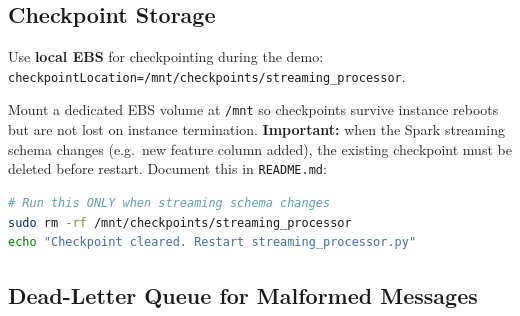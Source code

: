 \documentclass[11pt,a4paper]{article}
\begin{document}
\subsection{Checkpoint Storage}

\begin{importantbox}
Use \textbf{local EBS} for checkpointing during the demo:
\texttt{checkpointLocation=/mnt/checkpoints/streaming\_processor}.

Mount a dedicated EBS volume at \texttt{/mnt} so checkpoints survive instance reboots but are
not lost on instance termination. \textbf{Important:} when the Spark streaming schema changes
(e.g.\ new feature column added), the existing checkpoint must be deleted before restart.
Document this in \texttt{README.md}:

\begin{lstlisting}[language=bash]
# Run this ONLY when streaming schema changes
sudo rm -rf /mnt/checkpoints/streaming_processor
echo "Checkpoint cleared. Restart streaming_processor.py"
\end{lstlisting}
\end{importantbox}

\subsection{Dead-Letter Queue for Malformed Messages}
\end{document}
